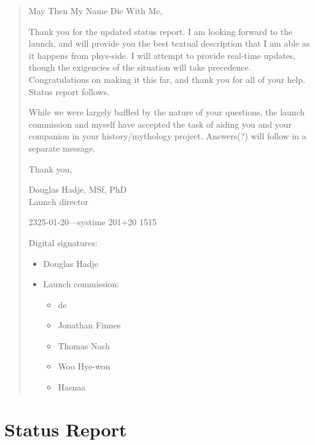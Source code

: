 \begin{quote}
May Then My Name Die With Me,

Thank you for the updated status report. I am looking forward to the launch, and will provide you the best textual description that I am able as it happens from phys-side. I will attempt to provide real-time updates, though the exigencies of the situation will take precedence. Congratulations on making it this far, and thank you for all of your help. Status report follows.

While we were largely baffled by the nature of your questions, the launch commission and myself have accepted the task of aiding you and your companion in your history/mythology project. Answers(?) will follow in a separate message.

Thank you,

Douglas Hadje, MSf, PhD\\
\indent Launch director

2325-01-20---systime 201+20 1515

Digital signatures:

\begin{itemize}
\tightlist
\item
  Douglas Hadje
\item
  Launch commission:

  \begin{itemize}
  \tightlist
  \item
    de
  \item
    Jonathan Finnes
  \item
    Thomas Nash
  \item
    Woo Hye-won
  \item
    Hasnaa
  \end{itemize}
\end{itemize}
\end{quote}

\vspace{-2em}

\hypertarget{status-report-1}{%
\section*{Status Report}\label{status-report-1}}


